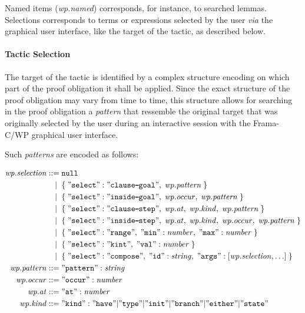 Named items (\textit{wp.named}) corresponds, for instance, to searched lemmas.
Selections corresponds to terms or expressions selected by the user \emph{via}
the graphical user interface, like the target of the tactic, as described below.

\paragraph{Tactic Selection} The target of the tactic
is identified by a complex structure
encoding on which part of the proof obligation it shall be applied. Since the
exact structure of the proof obligation may vary from time to time, this structure
allows for searching in the proof obligation a \emph{pattern} that ressemble the
original target that was originally selected by the user during an interactive
session with the \textsf{Frama-C/WP} graphical user interface.

Such \emph{patterns} are encoded as follows:

\newcommand{\dash}{\rule[0.5ex]{1ex}{1pt}}

\begin{align*}
    \mathit{wp.selection}
    ::=\;& \mathtt{null} \\
    |\;\;& \mathtt{\{}\; \mathtt{"select":"clause\dash{}goal"},\;
                         \mathit{wp.pattern} \;\mathtt{\}} \\
    |\;\;& \mathtt{\{}\; \mathtt{"select":"inside\dash{}goal"},\;
                         \mathit{wp.occur},\; \mathit{wp.pattern} \;\mathtt{\}} \\
    |\;\;& \mathtt{\{}\; \mathtt{"select":"clause\dash{}step"},\;
                         \mathit{wp.at},\; \mathit{wp.kind},\;
                         \mathit{wp.pattern} \;\mathtt{\}} \\
    |\;\;& \mathtt{\{}\; \mathtt{"select":"inside\dash{}step"},\;
                         \mathit{wp.at},\; \mathit{wp.kind},\;
                         \mathit{wp.occur},\; \mathit{wp.pattern} \;\mathtt{\}} \\
    |\;\;& \mathtt{\{}\; \mathtt{"select":"range"},\;
                         \mathtt{"min"}:\mathit{number},\;
                         \mathtt{"max"}:\mathit{number} \;\mathtt{\}} \\                         
    |\;\;& \mathtt{\{}\; \mathtt{"select":"kint"},\;
                         \mathtt{"val"}:\mathit{number} \;\mathtt{\}} \\
    |\;\;& \mathtt{\{}\; \mathtt{"select":"compose"},\;
                         \mathtt{"id"}:\mathit{string},\;
                         \mathtt{"args"}:[\mathit{wp.selection},\ldots]
                         \;\mathtt{\}} \\
    \mathit{wp.pattern} ::=\;& \mathtt{"pattern"} : \mathit{string} \\
    \mathit{wp.occur}   ::=\;& \mathtt{"occur"} : \mathit{number} \\
    \mathit{wp.at}      ::=\;& \mathtt{"at"} : \mathit{number} \\
    \mathit{wp.kind}    ::=\;& \mathtt{"kind"} : \mathtt{"have"|"type"|"init"|"branch"|"either"|"state"} \\
\end{align*}

